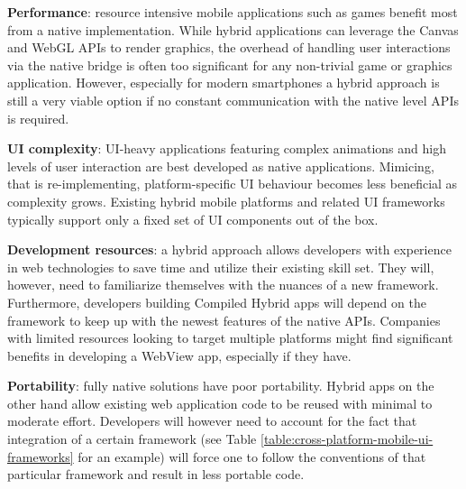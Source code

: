 \documentclass[thesis.tex]{subfiles}
\begin{document}
\begin{itemize}

	\begin{item}
	\textbf{Performance}: resource intensive mobile applications such as games benefit most from a native implementation. While hybrid applications can leverage the Canvas and WebGL APIs to render graphics, the overhead of handling user interactions via the native bridge is often too significant for any non-trivial game or graphics application. However, especially for modern smartphones a hybrid approach is still a very viable option if no constant communication with the native level APIs is required.
	\end{item}

	\begin{item}
	\textbf{UI complexity}: UI-heavy applications featuring complex animations and high levels of user interaction are best developed as native applications. Mimicing, that is re-implementing, platform-specific UI behaviour becomes less beneficial as complexity grows. Existing hybrid mobile platforms and related UI frameworks typically support only a fixed set of UI components out of the box.
	\end{item}

	\begin{item}
	\textbf{Development resources}: a hybrid approach allows developers with experience in web technologies to save time and utilize their existing skill set. They will, however, need to familiarize themselves with the nuances of a new framework. Furthermore, developers building Compiled Hybrid apps will depend on the framework to keep up with the newest features of the native APIs. Companies with limited resources looking to target multiple platforms might find significant benefits in developing a WebView app, especially if they have.
	\end{item}

	\begin{item}
	\textbf{Portability}: fully native solutions have poor portability. Hybrid apps on the other hand allow existing web application code to be reused with minimal to moderate effort. Developers will however need to account for the fact that integration of a certain framework (see Table \ref{table:cross-platform-mobile-ui-frameworks} for an example) will force one to follow the conventions of that particular framework and result in less portable code.
	\end{item}

\end{itemize}
\end{document}
